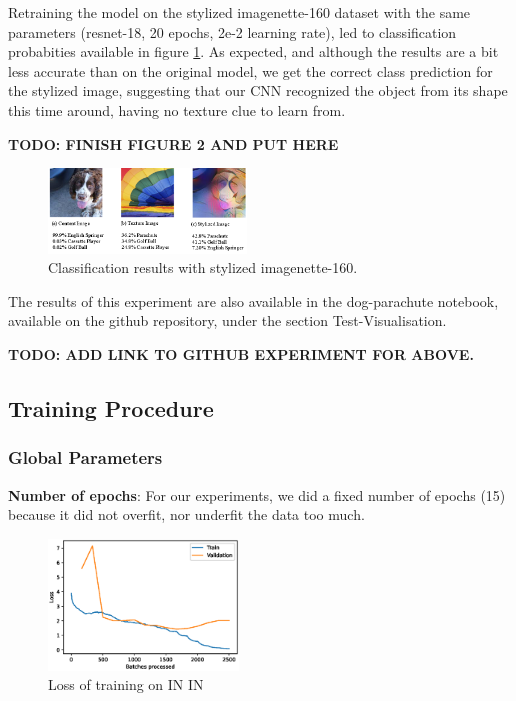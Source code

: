 \documentclass{article}
\begin{document}
\noindent
Retraining the model on the stylized imagenette-160 dataset with the same parameters 
(resnet-18, 20 epochs, 2e-2 learning rate), 
led to classification probabities available in figure \ref{stylized-dog-parachute}.
As expected, and although the results are a bit less accurate than on the original model, 
we get the correct class prediction for the stylized image, suggesting that our CNN recognized the object
from its shape this time around, having no texture clue to learn from.

\textbf{TODO: FINISH FIGURE 2 AND PUT HERE}

\begin{figure}[h!]\center
  \includegraphics[width=0.47\textwidth]{imgs/results-textures}
  \caption{Classification results with stylized imagenette-160.}
  \label{stylized-dog-parachute}
\end{figure}

\noindent
The results of this experiment are also available in the dog-parachute notebook, 
available on the github repository, under the section Test-Visualisation.

\textbf{TODO: ADD LINK TO GITHUB EXPERIMENT FOR ABOVE.}

\subsection{Training Procedure}

\subsubsection{Global Parameters}

\textbf{Number of epochs}: For our experiments, we did a fixed number of epochs (15) because it did not overfit, nor underfit the data too much.
\begin{figure}[h!]
  \includegraphics[width = 0.45\textwidth]{imgs/sin/loss}
  \caption{Loss of training on IN \texorpdfstring{\textrightarrow} .IN}
  \label{loss_in}
\end{figure}
\end{document}
